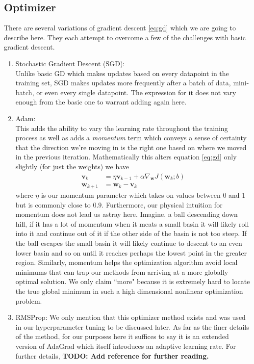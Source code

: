 \documentclass[10pt]{amsart}
\begin{document}
\subsection{Optimizer}
There are several variations of gradient descent \eqref{eq:gd} which we are going to describe here.
They each attempt to overcome a few of the challenges with basic gradient descent.
\begin{enumerate}
\item Stochastic Gradient Descent (SGD): \\
Unlike basic GD which makes updates based on every datapoint in the training set, SGD makes updates more frequently after a batch of data, mini-batch, or even every single datapoint.
The expression for it does not vary enough from the basic one to warrant adding again here.
\item Adam: \\
This adds the ability to vary the learning rate throughout the training process as well as adds a \textit{momentum} term which conveys a sense of certainty that the direction we're moving in is the right one based on where we moved in the previous iteration.
Mathematically this alters equation \eqref{eq:gd} only slightly (for just the weights) we have
\begin{equation}
\begin{split}
\bm v_k &= \eta \bm v_{k-1}  + \alpha \nabla_{\bm w} J(\bm w_{k}; b) \\
\bm w_{k + 1} &= \bm w_{k} - \bm v_k
\end{split}
\end{equation}
where $\eta$ is our momentum parameter which takes on values between 0 and 1 but is commonly close to $0.9$.
Furthermore, our physical intuition for momentum does not lead us astray here.
Imagine, a ball descending down hill, if it has a lot of momentum when it meats a small basin it will likely roll into it and continue out of it if the other side of the basin is not too steep.
If the ball escapes the small basin it will likely continue to descent to an even lower basin and so on until it reaches perhaps the lowest point in the greater region.
Similarly, momentum helps the optimization algorithm avoid local minimums that can trap our methods from arriving at a more globally optimal solution.
We only claim ``more" because it is extremely hard to locate the true global minimum in such a high dimensional nonlinear optimization problem.

\item RMSProp:
We only mention that this optimizer method exists and was used in our hyperparameter tuning to be discussed later.
As far as the finer details of the method, for our purposes here it suffices to say it is an extended version of AdaGrad which itself introduces an adaptive learning rate. For further details, \textbf{TODO: Add reference for further reading.}
\end{enumerate}
\end{document}
